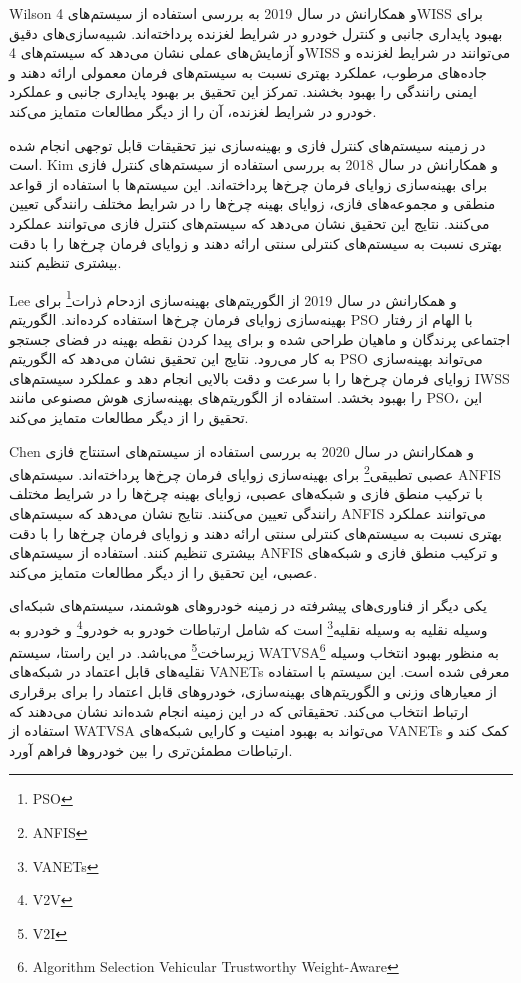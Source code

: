 \documentclass[a4paper,10pt]{article}
\begin{document}
        Wilson و همکارانش در سال 2019 به بررسی استفاده از سیستم‌های 4WISS برای بهبود پایداری جانبی و کنترل خودرو در شرایط لغزنده پرداخته‌اند. شبیه‌سازی‌های دقیق و آزمایش‌های عملی نشان می‌دهد که سیستم‌های 4WISS می‌توانند در شرایط لغزنده و جاده‌های مرطوب، عملکرد بهتری نسبت به سیستم‌های فرمان معمولی ارائه دهند و ایمنی رانندگی را بهبود بخشند. تمرکز این تحقیق بر بهبود پایداری جانبی و عملکرد خودرو در شرایط لغزنده، آن را از دیگر مطالعات متمایز می‌کند.

        در زمینه سیستم‌های کنترل فازی و بهینه‌سازی نیز تحقیقات قابل توجهی انجام شده است. Kim و همکارانش در سال 2018 به بررسی استفاده از سیستم‌های کنترل فازی برای بهینه‌سازی زوایای فرمان چرخ‌ها پرداخته‌اند. این سیستم‌ها با استفاده از قواعد منطقی و مجموعه‌های فازی، زوایای بهینه چرخ‌ها را در شرایط مختلف رانندگی تعیین می‌کنند. نتایج این تحقیق نشان می‌دهد که سیستم‌های کنترل فازی می‌توانند عملکرد بهتری نسبت به سیستم‌های کنترلی سنتی ارائه دهند و زوایای فرمان چرخ‌ها را با دقت بیشتری تنظیم کنند.

        Lee و همکارانش در سال 2019 از الگوریتم‌های بهینه‌سازی ازدحام ذرات\footnote{\hspace{2pt}PSO} برای بهینه‌سازی زوایای فرمان چرخ‌ها استفاده کرده‌اند. الگوریتم PSO با الهام از رفتار اجتماعی پرندگان و ماهیان طراحی شده و برای پیدا کردن نقطه بهینه در فضای جستجو به کار می‌رود. نتایج این تحقیق نشان می‌دهد که الگوریتم PSO می‌تواند بهینه‌سازی زوایای فرمان چرخ‌ها را با سرعت و دقت بالایی انجام دهد و عملکرد سیستم‌های IWSS را بهبود بخشد. استفاده از الگوریتم‌های بهینه‌سازی هوش مصنوعی مانند PSO، این تحقیق را از دیگر مطالعات متمایز می‌کند.

        Chen و همکارانش در سال 2020 به بررسی استفاده از سیستم‌های استنتاج فازی عصبی تطبیقی\footnote{\hspace{2pt}ANFIS} برای بهینه‌سازی زوایای فرمان چرخ‌ها پرداخته‌اند. سیستم‌های ANFIS با ترکیب منطق فازی و شبکه‌های عصبی، زوایای بهینه چرخ‌ها را در شرایط مختلف رانندگی تعیین می‌کنند. نتایج نشان می‌دهد که سیستم‌های ANFIS می‌توانند عملکرد بهتری نسبت به سیستم‌های کنترلی سنتی ارائه دهند و زوایای فرمان چرخ‌ها را با دقت بیشتری تنظیم کنند. استفاده از سیستم‌های ANFIS و ترکیب منطق فازی و شبکه‌های عصبی، این تحقیق را از دیگر مطالعات متمایز می‌کند.

        یکی دیگر از فناوری‌های پیشرفته در زمینه خودروهای هوشمند، سیستم‌های شبکه‌ای وسیله نقلیه به وسیله نقلیه\footnote{\hspace{2pt}VANETs} است که شامل ارتباطات خودرو به خودرو\footnote{\hspace{2pt}V2V} و خودرو به زیرساخت\footnote{\hspace{2pt}V2I} می‌باشد. در این راستا، سیستم WATVSA\footnote{\hspace{2pt}Algorithm Selection Vehicular Trustworthy Weight-Aware} به منظور بهبود انتخاب وسیله نقلیه‌های قابل اعتماد در شبکه‌های VANETs معرفی شده است. این سیستم با استفاده از معیارهای وزنی و الگوریتم‌های بهینه‌سازی، خودروهای قابل اعتماد را برای برقراری ارتباط انتخاب می‌کند. تحقیقاتی که در این زمینه انجام شده‌اند نشان می‌دهند که استفاده از WATVSA می‌تواند به بهبود امنیت و کارایی شبکه‌های VANETs کمک کند و ارتباطات مطمئن‌تری را بین خودروها فراهم آورد.
\end{document}
